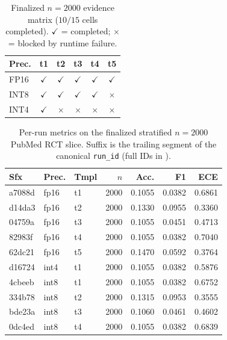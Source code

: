 \documentclass[conference]{IEEEtran}
\begin{document}
\begin{table}[!t]
\caption{Finalized $n=2000$ evidence matrix ($10/15$ cells completed).
$\checkmark$ = completed; $\times$ = blocked by runtime failure.}
\label{tab:matrix}
\centering
{\footnotesize
\begin{tabular}{@{}l ccccc@{}}
\hline
\textbf{Prec.} & \textbf{t1} & \textbf{t2} & \textbf{t3} & \textbf{t4} & \textbf{t5} \\
\hline
FP16 & $\checkmark$ & $\checkmark$ & $\checkmark$ & $\checkmark$ & $\checkmark$ \\
INT8 & $\checkmark$ & $\checkmark$ & $\checkmark$ & $\checkmark$ & $\times$ \\
INT4 & $\checkmark$ & $\times$     & $\times$     & $\times$     & $\times$ \\
\hline
\end{tabular}}
\end{table}

\begin{table}[!t]
\caption{Per-run metrics on the finalized stratified $n=2000$ PubMed RCT slice. Suffix is the trailing segment of the canonical \texttt{run\_id} (full IDs in \protect{}).}
\label{tab:metrics}
\centering
{\footnotesize
\begin{tabular}{@{}l l l r r r r@{}}
\hline
\textbf{Sfx} & \textbf{Prec.} & \textbf{Tmpl} & \textbf{$n$} & \textbf{Acc.} & \textbf{F1} & \textbf{ECE} \\
\hline
a7088d & fp16 & t1 & 2000 & 0.1055 & 0.0382 & 0.6861 \\
d14da3 & fp16 & t2 & 2000 & 0.1330 & 0.0955 & 0.3360 \\
04759a & fp16 & t3 & 2000 & 0.1055 & 0.0451 & 0.4713 \\
82983f & fp16 & t4 & 2000 & 0.1055 & 0.0382 & 0.7040 \\
62dc21 & fp16 & t5 & 2000 & 0.1470 & 0.0592 & 0.3764 \\
d16724 & int4 & t1 & 2000 & 0.1055 & 0.0382 & 0.5876 \\
4cbeeb & int8 & t1 & 2000 & 0.1055 & 0.0382 & 0.6752 \\
334b78 & int8 & t2 & 2000 & 0.1315 & 0.0953 & 0.3555 \\
bde23a & int8 & t3 & 2000 & 0.1060 & 0.0461 & 0.4602 \\
0dc4ed & int8 & t4 & 2000 & 0.1055 & 0.0382 & 0.6839 \\
\hline
\end{tabular}}
\end{table}
\end{document}
